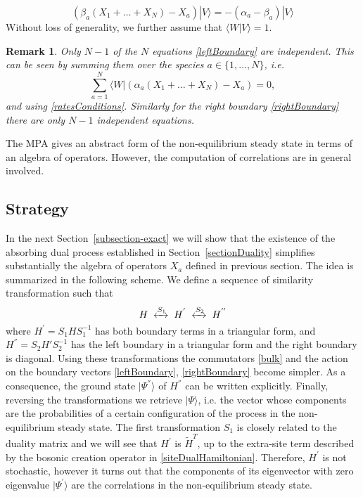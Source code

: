 \documentclass[10pt]{article}
\numberwithin{equation}{section}
\numberwithin{equation}{subsection}
\newtheorem{remark}{Remark}
\newcommand{\dt}{\;.}
\begin{document}
\begin{equation}\label{rightBoundary}
	\left(\beta_{a}(X_{1}+\ldots+X_{N})-X_{a}\right)|V\rangle=-(\alpha_{a}-\beta_{a})|V\rangle%
\end{equation}
Without loss of generality, we further assume that $\langle W|V\rangle=1$. 
\begin{remark} Only $N-1$ of the $N$ equations \eqref{leftBoundary}  are independent. This can be seen by summing them over the species $a\in \{1,\ldots,N\}$, i.e.
	\begin{equation}
		\sum_{a=1}^{N}	\langle W|\left(\alpha_{a}(X_{1}+\ldots+X_{N})-X_{a}\right)=0,%
	\end{equation}
	and using  \eqref{ratesConditions}.
 Similarly for the right boundary  \eqref{rightBoundary} there are only  $N-1$ independent equations. \end{remark} 
The MPA gives an abstract form of the non-equilibrium steady state in terms of an algebra of operators. However, the computation of  correlations are in general involved. 

\subsection{Strategy}
 In the next Section~\ref{subsection-exact} we will show that the existence of the absorbing dual process established in Section~\ref{sectionDuality} simplifies substantially the algebra of operators $X_a$ defined in previous
 section.  The idea is summarized in the following scheme. 
 We define a sequence of similarity transformation such that 
 \begin{equation}
 	H\;\xleftrightarrow{S_{1}}\;H^{'}\;\xleftrightarrow{S_{2}}\;H^{''}
 \end{equation} 
 where $H^{'}= S_{1} H S_{1}^{-1} $ has both boundary terms in a triangular form, and $H^{''} = S_{2}H' S_{2}^{-1}$ has the left boundary in a triangular form and the right boundary is diagonal. Using these transformations the commutators \eqref{bulk} and the action on the boundary vectors \eqref{leftBoundary}, \eqref{rightBoundary} become simpler. As a consequence, the ground state $|\Psi^{''}\rangle$ of $H^{''}$ can be written explicitly. Finally, reversing the transformations we retrieve $|\Psi\rangle$, i.e. the vector whose components are the probabilities of a certain configuration of the process in the non-equilibrium steady state.
 The first transformation $S_{1}$ is closely related to the duality matrix and we will see that $H^{'}$ is $\widetilde{H}^{T}$, up to the extra-site term described by the bosonic creation operator in \eqref{siteDualHamiltonian}. Therefore, $H^{'}$ is not stochastic, however it turns out that the components of its eigenvector with zero eigenvalue $|\Psi^{'}\rangle$ are the correlations in the non-equilibrium steady state. 
\end{document}
